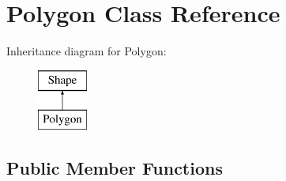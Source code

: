 \hypertarget{class_polygon}{}\section{Polygon Class Reference}
\label{class_polygon}
Inheritance diagram for Polygon\+:\begin{figure}[H]
\begin{center}
\leavevmode
\includegraphics[height=2.000000cm]{class_polygon}
\end{center}
\end{figure}
\subsection*{Public Member Functions}
